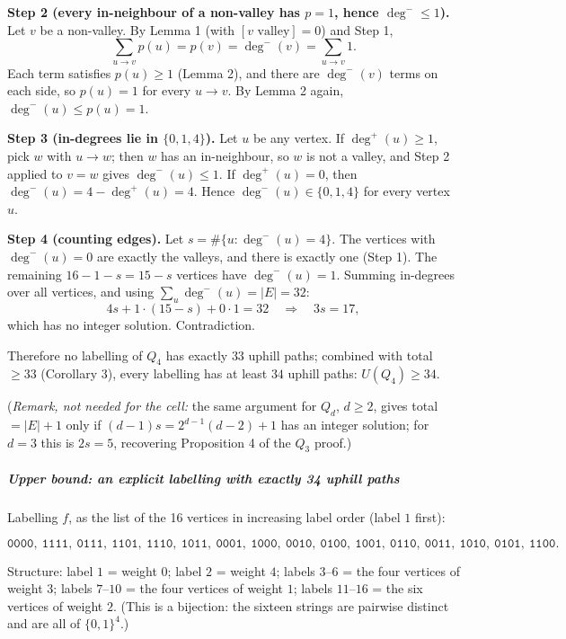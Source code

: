 \documentclass[11pt,a4paper]{article}
\begin{document}
\textbf{Step 2 (every in-neighbour of a non-valley has \(p=1\), hence
\(\deg^-\le1\)).} Let \(v\) be a non-valley. By Lemma 1 (with
\([v\text{ valley}]=0\)) and Step 1,
\[\sum_{u\to v}p(u)=p(v)=\deg^-(v)=\sum_{u\to v}1 .\] Each term
satisfies \(p(u)\ge1\) (Lemma 2), and there are \(\deg^-(v)\) terms on
each side, so \(p(u)=1\) for every \(u\to v\). By Lemma 2 again,
\(\deg^-(u)\le p(u)=1\).

\textbf{Step 3 (in-degrees lie in \(\{0,1,4\}\)).} Let \(u\) be any
vertex. If \(\deg^+(u)\ge1\), pick \(w\) with \(u\to w\); then \(w\) has
an in-neighbour, so \(w\) is not a valley, and Step 2 applied to \(v=w\)
gives \(\deg^-(u)\le1\). If \(\deg^+(u)=0\), then
\(\deg^-(u)=4-\deg^+(u)=4\). Hence \(\deg^-(u)\in\{0,1,4\}\) for every
vertex \(u\).

\textbf{Step 4 (counting edges).} Let \(s=\#\{u:\deg^-(u)=4\}\). The
vertices with \(\deg^-(u)=0\) are exactly the valleys, and there is
exactly one (Step 1). The remaining \(16-1-s=15-s\) vertices have
\(\deg^-(u)=1\). Summing in-degrees over all vertices, and using
\(\sum_u\deg^-(u)=|E|=32\):
\[4s+1\cdot(15-s)+0\cdot 1=32\quad\Longrightarrow\quad 3s=17,\] which
has no integer solution. Contradiction.

Therefore no labelling of \(Q_4\) has exactly \(33\) uphill paths;
combined with total \(\ge33\) (Corollary 3), every labelling has at
least \(34\) uphill paths: \(U(Q_4)\ge34\).

(\emph{Remark, not needed for the cell:} the same argument for \(Q_d\),
\(d\ge2\), gives total \(=|E|+1\) only if \((d-1)s=2^{d-1}(d-2)+1\) has
an integer solution; for \(d=3\) this is \(2s=5\), recovering
Proposition 4 of the \(Q_3\) proof.)

\subparagraph{Upper bound: an explicit labelling with exactly 34 uphill
paths}\label{upper-bound-an-explicit-labelling-with-exactly-34-uphill-paths}

Labelling \(f\), as the list of the 16 vertices in increasing label
order (label \(1\) first):

\[\texttt{0000},\ \texttt{1111},\ \texttt{0111},\ \texttt{1101},\ \texttt{1110},\ \texttt{1011},\ \texttt{0001},\ \texttt{1000},\ \texttt{0010},\ \texttt{0100},\ \texttt{1001},\ \texttt{0110},\ \texttt{0011},\ \texttt{1010},\ \texttt{0101},\ \texttt{1100}.\]

Structure: label \(1\) = weight \(0\); label \(2\) = weight \(4\);
labels \(3\)--\(6\) = the four vertices of weight \(3\); labels
\(7\)--\(10\) = the four vertices of weight \(1\); labels \(11\)--\(16\)
= the six vertices of weight \(2\). (This is a bijection: the sixteen
strings are pairwise distinct and are all of \(\{0,1\}^4\).)
\end{document}
